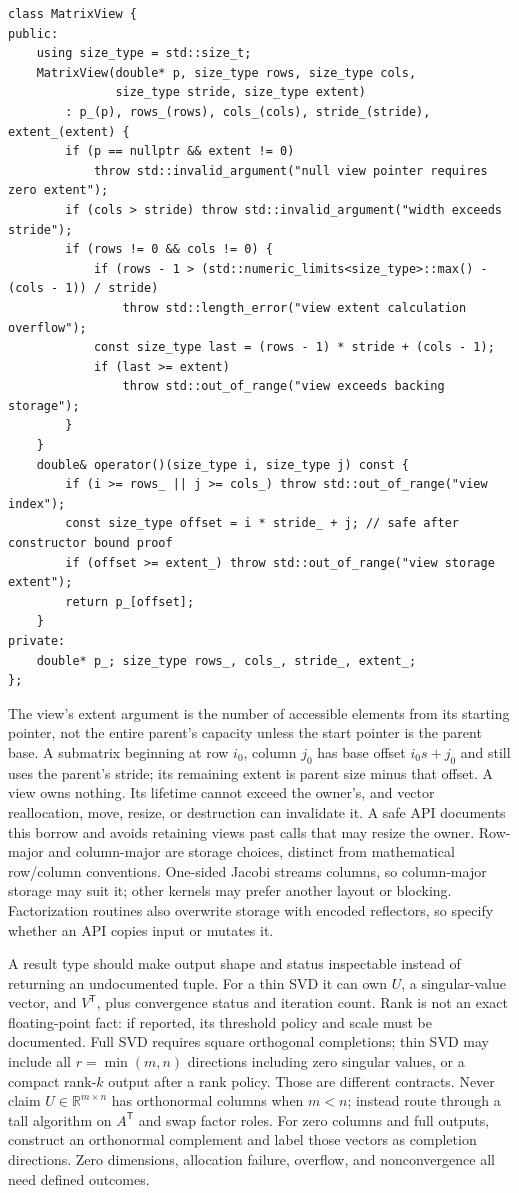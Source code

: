 \begin{verbatim}
class MatrixView {
public:
    using size_type = std::size_t;
    MatrixView(double* p, size_type rows, size_type cols,
               size_type stride, size_type extent)
        : p_(p), rows_(rows), cols_(cols), stride_(stride), extent_(extent) {
        if (p == nullptr && extent != 0)
            throw std::invalid_argument("null view pointer requires zero extent");
        if (cols > stride) throw std::invalid_argument("width exceeds stride");
        if (rows != 0 && cols != 0) {
            if (rows - 1 > (std::numeric_limits<size_type>::max() - (cols - 1)) / stride)
                throw std::length_error("view extent calculation overflow");
            const size_type last = (rows - 1) * stride + (cols - 1);
            if (last >= extent)
                throw std::out_of_range("view exceeds backing storage");
        }
    }
    double& operator()(size_type i, size_type j) const {
        if (i >= rows_ || j >= cols_) throw std::out_of_range("view index");
        const size_type offset = i * stride_ + j; // safe after constructor bound proof
        if (offset >= extent_) throw std::out_of_range("view storage extent");
        return p_[offset];
    }
private:
    double* p_; size_type rows_, cols_, stride_, extent_;
};
\end{verbatim}

The view's extent argument is the number of accessible elements from its starting pointer, not the entire parent's capacity unless the start pointer is the parent base. A submatrix beginning at row \(i_0\), column \(j_0\) has base offset \(i_0s+j_0\) and still uses the parent's stride; its remaining extent is parent size minus that offset. A view owns nothing. Its lifetime cannot exceed the owner's, and vector reallocation, move, resize, or destruction can invalidate it. A safe API documents this borrow and avoids retaining views past calls that may resize the owner. Row-major and column-major are storage choices, distinct from mathematical row/column conventions. One-sided Jacobi streams columns, so column-major storage may suit it; other kernels may prefer another layout or blocking. Factorization routines also overwrite storage with encoded reflectors, so specify whether an API copies input or mutates it.

A result type should make output shape and status inspectable instead of returning an undocumented tuple. For a thin SVD it can own \(U\), a singular-value vector, and \(V^\mathsf T\), plus convergence status and iteration count. Rank is not an exact floating-point fact: if reported, its threshold policy and scale must be documented. Full SVD requires square orthogonal completions; thin SVD may include all \(r=\min(m,n)\) directions including zero singular values, or a compact rank-\(k\) output after a rank policy. Those are different contracts. Never claim \(U\in\mathbb R^{m\times n}\) has orthonormal columns when \(m<n\); instead route through a tall algorithm on \(A^\mathsf T\) and swap factor roles. For zero columns and full outputs, construct an orthonormal complement and label those vectors as completion directions. Zero dimensions, allocation failure, overflow, and nonconvergence all need defined outcomes.

